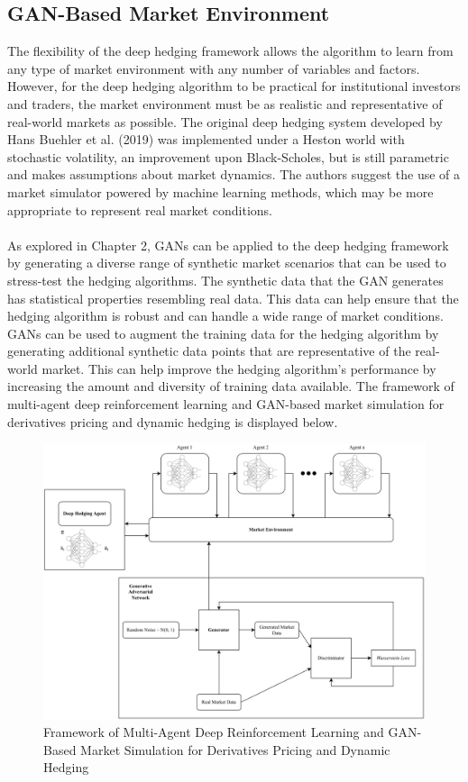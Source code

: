 \subsection{GAN-Based Market Environment}
The flexibility of the deep hedging framework allows the algorithm to learn from any type of market environment with any number of variables and factors. However, for the deep hedging algorithm to be practical for institutional investors and traders, the market environment must be as realistic and representative of real-world markets as possible. The original deep hedging system developed by Hans Buehler et al. (2019) was implemented under a Heston world with stochastic volatility, an improvement upon Black-Scholes, but is still parametric and makes assumptions about market dynamics. The authors suggest the use of a market simulator powered by machine learning methods, which may be more appropriate to represent real market conditions.
\\ \\
As explored in Chapter 2, GANs can be applied to the deep hedging framework by generating a diverse range of synthetic market scenarios that can be used to stress-test the hedging algorithms. The synthetic data that the GAN generates has statistical properties resembling real data. This data can help ensure that the hedging algorithm is robust and can handle a wide range of market conditions. GANs can be used to augment the training data for the hedging algorithm by generating additional synthetic data points that are representative of the real-world market. This can help improve the hedging algorithm's performance by increasing the amount and diversity of training data available. The framework of multi-agent deep reinforcement learning and GAN-based market simulation for derivatives pricing and dynamic hedging is displayed below.
\begin{figure}[h]
\centering
\includegraphics[width=14cm]{templates/assets/drl/rl_gan_combined.png}
\caption{Framework of Multi-Agent Deep Reinforcement Learning and GAN-Based Market Simulation for Derivatives Pricing and Dynamic Hedging}
\end{figure}

